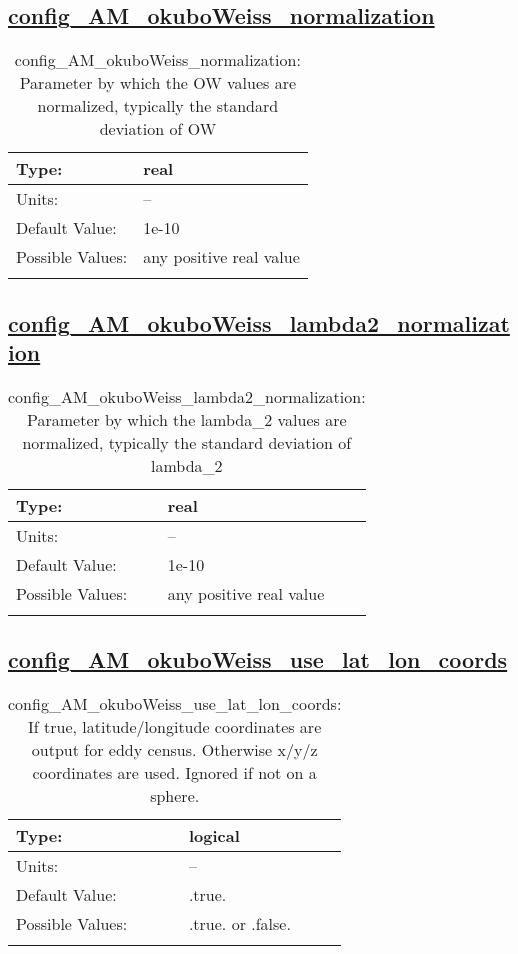 \subsection[config\_AM\_okuboWeiss\_normalization]{\hyperref[sec:nm_tab_AM_okuboWeiss]{config\_AM\_okuboWeiss\_normalization}}
\label{subsec:nm_sec_config_AM_okuboWeiss_normalization}
\begin{center}
\begin{longtable}{| p{2.0in} || p{4.0in} |}
    \hline
    Type: & real \\
    \hline
    Units: & -- \\
    \hline
    Default Value: & 1e-10 \\
    \hline
    Possible Values: & any positive real value \\
    \hline
    \caption{config\_AM\_okuboWeiss\_normalization: Parameter by which the OW values are normalized, typically the standard deviation of OW}
\end{longtable}
\end{center}
\subsection[config\_AM\_okuboWeiss\_lambda2\_normalization]{\hyperref[sec:nm_tab_AM_okuboWeiss]{config\_AM\_okuboWeiss\_lambda2\_normalization}}
\label{subsec:nm_sec_config_AM_okuboWeiss_lambda2_normalization}
\begin{center}
\begin{longtable}{| p{2.0in} || p{4.0in} |}
    \hline
    Type: & real \\
    \hline
    Units: & -- \\
    \hline
    Default Value: & 1e-10 \\
    \hline
    Possible Values: & any positive real value \\
    \hline
    \caption{config\_AM\_okuboWeiss\_lambda2\_normalization: Parameter by which the lambda\_2 values are normalized, typically the standard deviation of lambda\_2}
\end{longtable}
\end{center}
\subsection[config\_AM\_okuboWeiss\_use\_lat\_lon\_coords]{\hyperref[sec:nm_tab_AM_okuboWeiss]{config\_AM\_okuboWeiss\_use\_lat\_lon\_coords}}
\label{subsec:nm_sec_config_AM_okuboWeiss_use_lat_lon_coords}
\begin{center}
\begin{longtable}{| p{2.0in} || p{4.0in} |}
    \hline
    Type: & logical \\
    \hline
    Units: & -- \\
    \hline
    Default Value: & .true. \\
    \hline
    Possible Values: & .true. or .false. \\
    \hline
    \caption{config\_AM\_okuboWeiss\_use\_lat\_lon\_coords: If true, latitude/longitude coordinates are output for eddy census. Otherwise x/y/z coordinates are used. Ignored if not on a sphere.}
\end{longtable}
\end{center}
